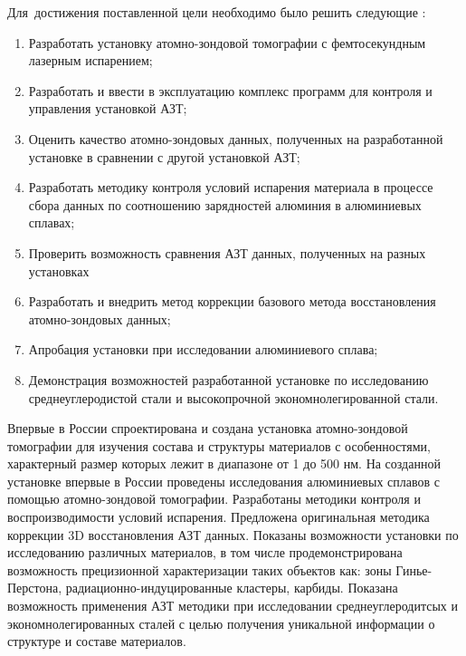 Для~достижения поставленной цели необходимо было решить следующие {\tasks}:
\begin{enumerate}[beginpenalty=10000]
  \item Разработать установку атомно-зондовой томографии с фемтосекундным лазерным испарением;
  \item Разработать и ввести в эксплуатацию комплекс программ для контроля и управления установкой АЗТ;
  \item Оценить качество атомно-зондовых данных, полученных на разработанной установке в сравнении с другой установкой АЗТ;
  \item Разработать методику контроля условий испарения материала в процессе сбора данных по соотношению зарядностей алюминия в алюминиевых сплавах;
  \item Проверить возможность сравнения АЗТ данных, полученных на разных установках
  \item Разработать и внедрить метод коррекции базового метода восстановления атомно-зондовых данных;
  \item Апробация установки при исследовании алюминиевого сплава;
  \item Демонстрация возможностей разработанной установке по исследованию среднеуглеродистой стали и высокопрочной экономнолегированной стали.
\end{enumerate}


{\novelty}
Впервые в России спроектирована и создана установка атомно-зондовой томографии для изучения состава и структуры материалов с особенностями, характерный размер которых лежит в диапазоне от 1 до 500 нм. На созданной установке впервые в России проведены исследования алюминиевых сплавов с помощью атомно-зондовой томографии. Разработаны методики контроля и воспроизводимости условий испарения. Предложена оригинальная методика коррекции 3D восстановления АЗТ данных. Показаны возможности установки по исследованию различных материалов, в том числе продемонстрирована возможность прецизионной характеризации таких объектов как: зоны Гинье-Перстона, радиационно-индуцированные кластеры, карбиды. Показана возможность применения АЗТ методики при исследовании среднеуглеродитсых и экономнолегированных сталей с целью получения уникальной информации о структуре и составе материалов.


